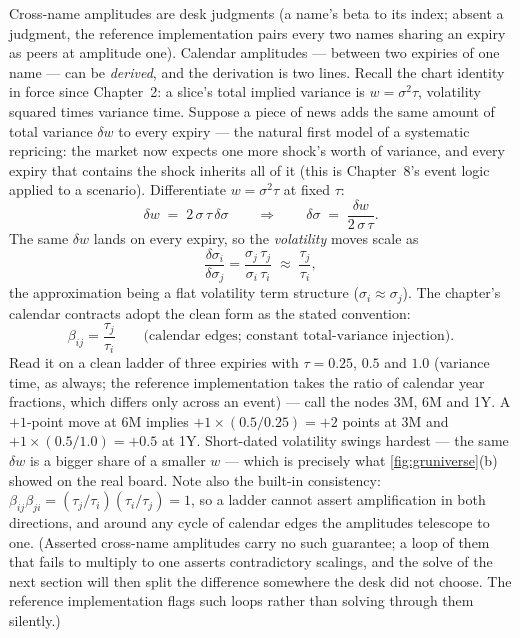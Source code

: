Cross-name amplitudes are desk judgments (a name's beta to its
index; absent a judgment, the reference implementation pairs every
two names sharing an expiry as peers at amplitude one).  Calendar
amplitudes --- between two expiries of one name ---
can be \emph{derived}, and the derivation is two lines.  Recall the
chart identity in force since Chapter~2: a slice's total implied
variance is $w=\sigma^{2}\tau$, volatility squared times variance
time.  Suppose a piece of news adds the same amount of total variance
$\delta w$ to every expiry --- the natural first model of a systematic
repricing: the market now expects one more shock's worth of variance,
and every expiry that contains the shock inherits all of it (this is
Chapter~8's event logic applied to a scenario).  Differentiate
$w=\sigma^{2}\tau$ at fixed $\tau$:
\[
\delta w \;=\; 2\,\sigma\,\tau\,\delta\sigma
\qquad\Longrightarrow\qquad
\delta\sigma \;=\; \frac{\delta w}{2\,\sigma\,\tau}.
\]
The same $\delta w$ lands on every expiry, so the \emph{volatility}
moves scale as
\[
\frac{\delta\sigma_i}{\delta\sigma_j}
=\frac{\sigma_j\,\tau_j}{\sigma_i\,\tau_i}
\;\approx\;\frac{\tau_j}{\tau_i},
\]
the approximation being a flat volatility term structure
($\sigma_i\approx\sigma_j$).  The chapter's calendar contracts adopt
the clean form as the stated convention:
\begin{equation}
\beta_{ij}=\frac{\tau_j}{\tau_i}
\qquad\text{(calendar edges; constant total-variance injection)}.
\label{eq:grcalbeta}
\end{equation}
Read it on a clean ladder of three expiries with $\tau=0.25$, $0.5$
and $1.0$ (variance time, as always; the reference implementation
takes the ratio of calendar year fractions, which differs only
across an event) --- call the nodes 3M, 6M and 1Y.  A $+1$-point move at 6M implies
$+1\times(0.5/0.25)=+2$ points at 3M and $+1\times(0.5/1.0)=+0.5$ at
1Y.  Short-dated volatility swings hardest --- the same $\delta w$ is a
bigger share of a smaller $w$ --- which is precisely what
\cref{fig:gruniverse}(b) showed on the real board.  Note also the
built-in consistency: $\beta_{ij}\beta_{ji}
=(\tau_j/\tau_i)(\tau_i/\tau_j)=1$, so a ladder cannot assert
amplification in both directions, and around any cycle of calendar
edges the amplitudes telescope to one.  (Asserted cross-name
amplitudes carry no such guarantee; a loop of them that fails to
multiply to one asserts contradictory scalings, and the solve of the
next section will then split the difference somewhere the desk did not
choose.  The reference implementation flags such loops rather than
solving through them silently.)

